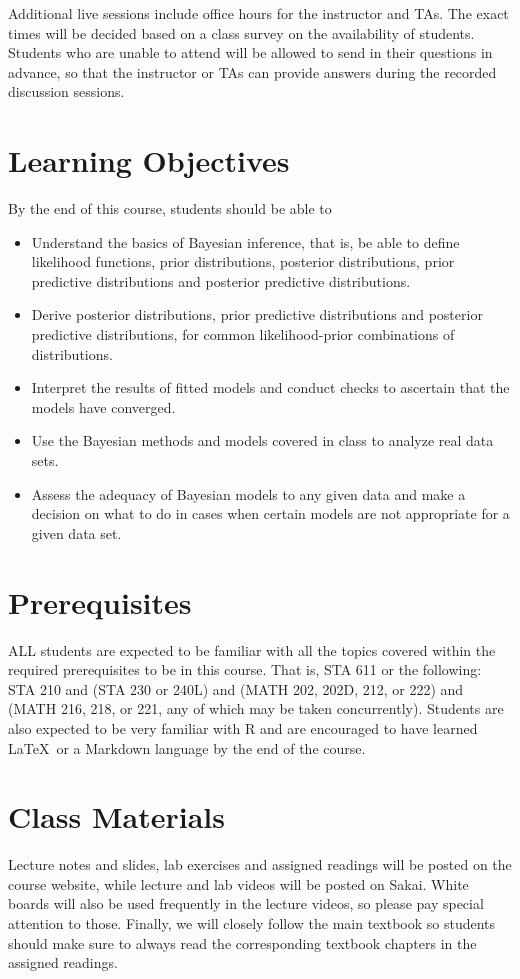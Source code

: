 \documentclass[11pt, a4paper]{article}
\begin{document}
Additional live sessions include office hours for the instructor and TAs. The exact times will be decided based on a class survey on the availability of students. Students who are unable to attend will be allowed to send in their questions in advance, so that the instructor or TAs can provide answers during the recorded discussion sessions.

\section{Learning Objectives}
By the end of this course, students should be able to
\begin{itemize}[label= {\color{darkblue}{\ArrowBoldRightStrobe}}]
	\item Understand the basics of Bayesian inference, that is, be able to define likelihood functions, prior distributions, posterior distributions, prior predictive distributions and posterior predictive distributions.
	\item Derive posterior distributions, prior predictive distributions and posterior predictive distributions, for common likelihood-prior combinations of distributions.
	\item Interpret the results of fitted models and conduct checks to ascertain that the models have converged.
	\item Use the Bayesian methods and models covered in class to analyze real data sets.
	\item Assess the adequacy of Bayesian models to any given data and make a decision on what to do in cases when certain models are not appropriate for a given data set.
\end{itemize}


\section{Prerequisites}
ALL students are expected to be familiar with all the topics covered within the required prerequisites to be in this course. That is, STA 611 or the following: STA 210 and (STA 230 or 240L) and (MATH 202, 202D, 212, or 222) and (MATH 216, 218, or 221, any of which may be taken concurrently). Students are also expected to be very familiar with \textsf{R} and are encouraged to have learned \LaTeX \ or a Markdown language by the end of the course.


\section{Class Materials}
Lecture notes and slides, lab exercises and assigned readings will be posted on the course website, while lecture and lab videos will be posted on Sakai. White boards will also be used frequently in the lecture videos, so please pay special attention to those. Finally, we will closely follow the main textbook so students should make sure to always read the corresponding textbook chapters in the assigned readings.
\end{document}
